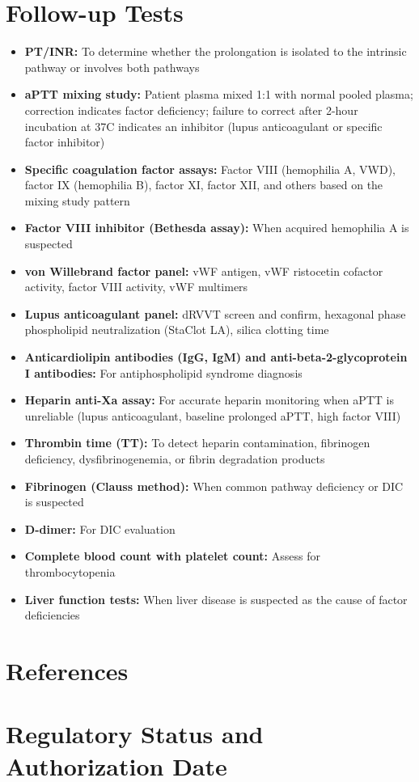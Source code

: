 \section*{Follow-up Tests}
\begin{itemize}
  \item \textbf{PT/INR:} To determine whether the prolongation is isolated to the intrinsic pathway or involves both pathways
  \item \textbf{aPTT mixing study:} Patient plasma mixed 1:1 with normal pooled plasma; correction indicates factor deficiency; failure to correct after 2-hour incubation at 37\textdegree{}C indicates an inhibitor (lupus anticoagulant or specific factor inhibitor)
  \item \textbf{Specific coagulation factor assays:} Factor VIII (hemophilia A, VWD), factor IX (hemophilia B), factor XI, factor XII, and others based on the mixing study pattern
  \item \textbf{Factor VIII inhibitor (Bethesda assay):} When acquired hemophilia A is suspected
  \item \textbf{von Willebrand factor panel:} vWF antigen, vWF ristocetin cofactor activity, factor VIII activity, vWF multimers
  \item \textbf{Lupus anticoagulant panel:} dRVVT screen and confirm, hexagonal phase phospholipid neutralization (StaClot LA), silica clotting time
  \item \textbf{Anticardiolipin antibodies (IgG, IgM) and anti-beta-2-glycoprotein I antibodies:} For antiphospholipid syndrome diagnosis
  \item \textbf{Heparin anti-Xa assay:} For accurate heparin monitoring when aPTT is unreliable (lupus anticoagulant, baseline prolonged aPTT, high factor VIII)
  \item \textbf{Thrombin time (TT):} To detect heparin contamination, fibrinogen deficiency, dysfibrinogenemia, or fibrin degradation products
  \item \textbf{Fibrinogen (Clauss method):} When common pathway deficiency or DIC is suspected
  \item \textbf{D-dimer:} For DIC evaluation
  \item \textbf{Complete blood count with platelet count:} Assess for thrombocytopenia
  \item \textbf{Liver function tests:} When liver disease is suspected as the cause of factor deficiencies
\end{itemize}

\section*{References}



\clearpage
\section*{Regulatory Status and Authorization Date}

\clearpage
